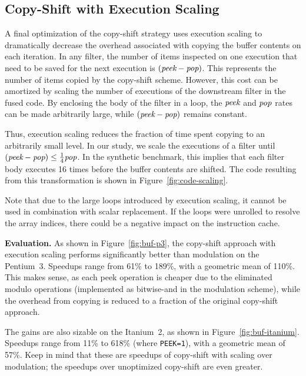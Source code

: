 \subsection{Copy-Shift with Execution Scaling}

A final optimization of the copy-shift strategy uses execution scaling
to dramatically decrease the overhead associated with copying the
buffer contents on each iteration.  In any filter, the number of items
inspected on one execution that need to be saved for the next
execution is $(\mbox{\it peek} - \mbox{\it pop})$.  This represents
the number of items copied by the copy-shift scheme.  However, this
cost can be amortized by scaling the number of executions of the
downstream filter in the fused code.  By enclosing the body of the
filter in a loop, the $\mbox{\it peek}$ and $\mbox{\it pop}$ rates can
be made arbitrarily large, while $(\mbox{\it peek} - \mbox{\it pop})$
remains constant.

Thus, execution scaling reduces the fraction of time spent copying to
an arbitrarily small level.  In our study, we scale the executions of
a filter until $(\mbox{\it peek} - \mbox{\it pop}) \leq \frac{1}{4}
\mbox{\it pop}$.  In the synthetic benchmark, this implies that each
filter body executes 16 times before the buffer contents are shifted.
The code resulting from this transformation is shown in
Figure~\ref{fig:code-scaling}.

Note that due to the large loops introduced by execution scaling, it
cannot be used in combination with scalar replacement.  If the loops
were unrolled to resolve the array indices, there could be a negative
impact on the instruction cache.

{\bf Evaluation.}  As shown in Figure~\ref{fig:buf-p3}, the copy-shift
approach with execution scaling performs significantly better than
modulation on the Pentium~3.  Speedups range from 61\% to 189\%, with a
geometric mean of 110\%.  This makes sense, as each peek operation is
cheaper due to the eliminated modulo operations (implemented as
bitwise-and in the modulation scheme), while the overhead from copying
is reduced to a fraction of the original copy-shift approach.  

The gains are also sizable on the Itanium~2, as shown in
Figure~\ref{fig:buf-itanium}.  Speedups range from 11\% to 618\%
(where {\tt PEEK=1}), with a geometric mean of 57\%.  Keep in mind
that these are speedups of copy-shift with scaling over modulation;
the speedups over unoptimized copy-shift are even greater.


